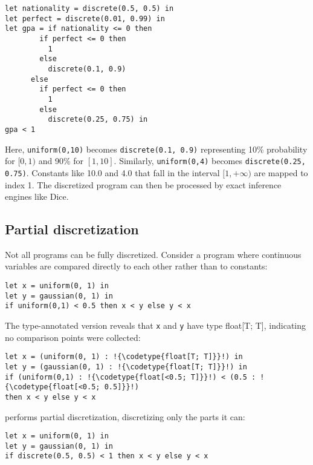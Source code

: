 \documentclass[acmsmall,screen,dvipsnames,x11names,nonacm,anonymous,review]{acmart}
\newcommand{\codetype}[1]{\textcolor{typecolor}{\ttfamily\small#1}}
\newcommand{\Slice}{\text{\scshape Slice}\xspace}
\begin{document}
\begin{lstlisting}[aboveskip=1em,belowskip=1em]
let nationality = discrete(0.5, 0.5) in
let perfect = discrete(0.01, 0.99) in
let gpa = if nationality <= 0 then
        if perfect <= 0 then
          1
        else
          discrete(0.1, 0.9)
      else
        if perfect <= 0 then
          1
        else
          discrete(0.25, 0.75) in
gpa < 1
\end{lstlisting}

\noindent Here, \texttt{uniform(0,10)} becomes \texttt{discrete(0.1, 0.9)} representing 10\% probability for $[0,1)$ and 90\% for $[1,10]$. Similarly, \texttt{uniform(0,4)} becomes \texttt{discrete(0.25, 0.75)}. Constants like 10.0 and 4.0 that fall in the interval $[1,+\infty)$ are mapped to index 1. The discretized program can then be processed by exact inference engines like Dice.

\subsection{Partial discretization}

Not all programs can be fully discretized. Consider a program where continuous variables are compared directly to each other rather than to constants:

\begin{lstlisting}[aboveskip=1em,belowskip=1em,escapechar=!]
let x = uniform(0, 1) in
let y = gaussian(0, 1) in
if uniform(0,1) < 0.5 then x < y else y < x
\end{lstlisting}

\noindent The type-annotated version reveals that \texttt{x} and \texttt{y} have type \codetype{float[T; T]}, indicating no comparison points were collected:

\begin{lstlisting}[aboveskip=1em,belowskip=1em,escapechar=!]
let x = (uniform(0, 1) : !{\codetype{float[T; T]}}!) in
let y = (gaussian(0, 1) : !{\codetype{float[T; T]}}!) in
if (uniform(0,1) : !{\codetype{float[<0.5; T]}}!) < (0.5 : !{\codetype{float[<0.5; 0.5]}}!) 
then x < y else y < x
\end{lstlisting}

\noindent \Slice performs partial discretization, discretizing only the parts it can:

\begin{lstlisting}[aboveskip=1em,belowskip=1em]
let x = uniform(0, 1) in
let y = gaussian(0, 1) in
if discrete(0.5, 0.5) < 1 then x < y else y < x
\end{lstlisting}
\end{document}
